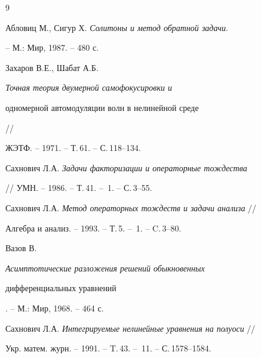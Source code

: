 \begin{thebibliography}{9} 


 




Абловиц М., Сигур Х. {\em Солитоны и метод обратной задачи}. 


-- М.: Мир, 1987. -- 480 с. 




Захаров В.Е., Шабат А.Б. {\em Точная теория двумерной самофокусировки и 


одномерной автомодуляции волн в нелинейной среде } // 


ЖЭТФ. -- 1971. -- Т.\,61. -- С.\,118--134. 




Сахнович Л.А. {\em Задачи факторизации и операторные тождества} 


// УМН. -- 1986. -- Т.\,41. -- \No\,1. -- С.\,3--55. 




Сахнович Л.А. {\em Метод операторных тождеств и задачи анализа} // 


Алгебра и анализ. -- 1993. -- Т.\,5. -- \No\,1. -- C.\,3--80.




Вазов В. {\em Асимптотические разложения решений обыкновенных 


дифференциальных уравнений}. -- М.: Мир, 1968. -- 464 с. 




Сахнович Л.А. {\em Интегрируемые нелинейные уравнения на полуоси} // 


Укр. матем. журн. -- 1991. -- T.\,43. -- \No\,11. -- С.\,1578--1584. 


 


\end{thebibliography} 


 


\vskip 2cm 


 






 


\label{end} 


 


